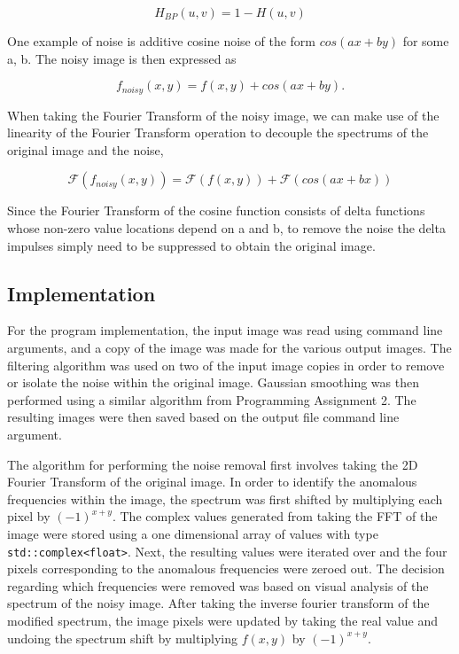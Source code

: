 \documentclass[headings=optiontoheadandtoc,listof=totoc,parskip=full]{scrartcl}
\begin{document}
\[
	H_{BP}(u,v) = 1 - H(u,v)
\]

One example of noise is additive cosine noise of the form \(cos(ax + by)\) for some a, b. The noisy image is then expressed as 

\[
	f_{noisy} (x, y) =  f(x, y) + cos(ax + by).
\]

When taking the Fourier Transform of the noisy image, we can make use of the linearity of the Fourier Transform operation to decouple the spectrums of the original image and the noise,

\[
	\mathcal{F}(f_{noisy}(x, y)) = \mathcal{F}( f(x, y) ) + \mathcal{F}(cos(ax + bx))
\]

Since the Fourier Transform of the cosine function consists of delta functions whose non-zero value locations depend on a and b, to remove the noise the delta impulses simply need to be suppressed to obtain the original image.



\subsection{Implementation}

For the program implementation, the input image was read using command line arguments, and a copy of the image was made for the various output images. The filtering algorithm was used on two of the input image copies in order to remove or isolate the noise within the original image. Gaussian smoothing was then performed using a similar algorithm from Programming Assignment 2. The resulting images were then saved based on the output file command line argument.

The algorithm for performing the noise removal first involves taking the 2D Fourier Transform of the original image. In order to identify the anomalous frequencies within the image, the spectrum was first shifted by multiplying each pixel by \((-1)^{x + y}\). The complex values generated from taking the FFT of the image were stored using a one dimensional array of values with type \texttt{std::complex<float>}. Next, the resulting values were iterated over and the four pixels corresponding to the anomalous frequencies were zeroed out. The decision regarding which frequencies were removed was based on visual analysis of the spectrum of the noisy image. After taking the inverse fourier transform of the modified spectrum, the image pixels were updated by taking the real value and undoing the spectrum shift by multiplying $f(x,y)$ by \((-1)^{x + y}\).
\end{document}
